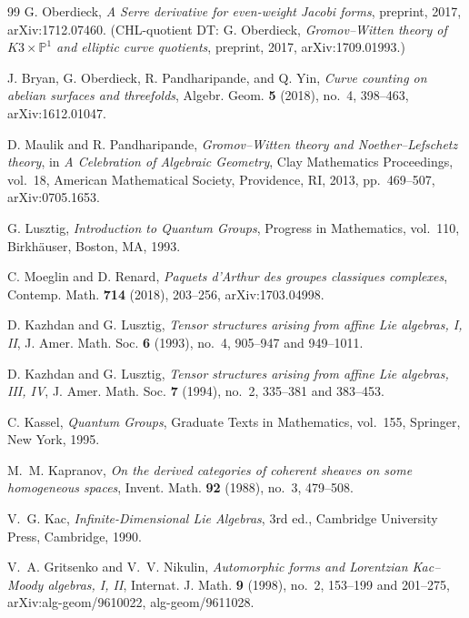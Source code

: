 \begin{thebibliography}{99}
G. Oberdieck, \emph{A Serre derivative for even-weight Jacobi forms}, preprint, 2017, arXiv:1712.07460. (CHL-quotient DT: G. Oberdieck, \emph{Gromov--Witten theory of $K3 \times \mathbb{P}^1$ and elliptic curve quotients}, preprint, 2017, arXiv:1709.01993.)

J. Bryan, G. Oberdieck, R. Pandharipande, and Q. Yin, \emph{Curve counting on abelian surfaces and threefolds}, Algebr. Geom. \textbf{5} (2018), no.~4, 398--463, arXiv:1612.01047.

D. Maulik and R. Pandharipande, \emph{Gromov--Witten theory and Noether--Lefschetz theory}, in \emph{A Celebration of Algebraic Geometry}, Clay Mathematics Proceedings, vol.~18, American Mathematical Society, Providence, RI, 2013, pp.~469--507, arXiv:0705.1653.

G. Lusztig, \emph{Introduction to Quantum Groups}, Progress in Mathematics, vol.~110, Birkh\"auser, Boston, MA, 1993.

C. Moeglin and D. Renard, \emph{Paquets d'Arthur des groupes classiques complexes}, Contemp. Math. \textbf{714} (2018), 203--256, arXiv:1703.04998.

D. Kazhdan and G. Lusztig, \emph{Tensor structures arising from affine Lie algebras, I, II}, J. Amer. Math. Soc. \textbf{6} (1993), no.~4, 905--947 and 949--1011.

D. Kazhdan and G. Lusztig, \emph{Tensor structures arising from affine Lie algebras, III, IV}, J. Amer. Math. Soc. \textbf{7} (1994), no.~2, 335--381 and 383--453.

C. Kassel, \emph{Quantum Groups}, Graduate Texts in Mathematics, vol.~155, Springer, New York, 1995.

M.~M. Kapranov, \emph{On the derived categories of coherent sheaves on some homogeneous spaces}, Invent. Math. \textbf{92} (1988), no.~3, 479--508.

V.~G. Kac, \emph{Infinite-Dimensional Lie Algebras}, 3rd ed., Cambridge University Press, Cambridge, 1990.

V.~A. Gritsenko and V.~V. Nikulin, \emph{Automorphic forms and Lorentzian Kac--Moody algebras, I, II}, Internat. J. Math. \textbf{9} (1998), no.~2, 153--199 and 201--275, arXiv:alg-geom/9610022, alg-geom/9611028.


\end{thebibliography}
